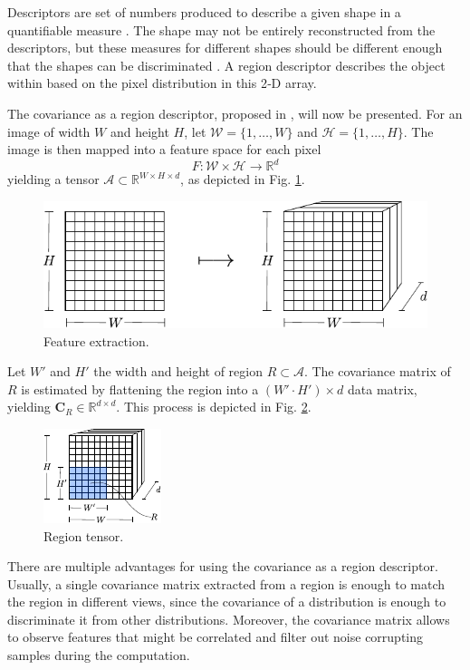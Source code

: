 \documentclass[11pt]{article}
\theoremstyle{definition}
\theoremstyle{remark}
\theoremstyle{remark}
\theoremstyle{remark}
\newcommand{\R}{{\mathbb{R}}}
\begin{document}
Descriptors are set of numbers produced to describe a given shape in a
quantifiable measure \parencite{tyagi2018content}. The shape may not be entirely
reconstructed from the descriptors, but these measures for different shapes
should be different enough that the shapes can be discriminated
\parencite{cui2013fusing}. A region descriptor describes the object within based
on the pixel distribution in this 2‐D array.

The covariance as a region descriptor, proposed in \parencite{tuzel2006}, will
now be presented. For an image of width $W$ and height $H$, let
$\mathcal{W}=\{1,\ldots,W\}$ and $\mathcal{H}=\{1,\ldots,H\}$. The image is then
mapped into a feature space for each pixel
%
\[
  F:\mathcal{W}\times\mathcal{H}\rightarrow\mathbb{R}^{d}
\]
%
yielding a tensor $\mathcal{A} \subset \R^{W \times H \times d}$, as depicted in
Fig. \ref{fig:feat_ext}.
%
\begin{figure}[H]
  \centering \includegraphics[width =
  0.6\linewidth]{figs/feature_extraction.pdf}
  \caption{Feature extraction.}
  \label{fig:feat_ext}
\end{figure}
%
Let $W'$ and $H'$ the width and height of region $R\subset\mathcal{A}$. The
covariance matrix of $R$ is estimated by flattening the region into a
$(W'\cdot H')\times d$ data matrix, yielding $\mathbf{C}_R \in \R^{d \times d}$.
This process is depicted in Fig. \ref{fig:region}.
%
\begin{figure}[H]
  \centering \includegraphics[width = 0.3\linewidth]{figs/region1.pdf}
  \caption{Region tensor.}
  \label{fig:region}
\end{figure}
%
There are multiple advantages for using the covariance as a region descriptor.
Usually, a single covariance matrix extracted from a region is enough to match
the region in different views, since the covariance of a distribution is enough
to discriminate it from other distributions. Moreover, the covariance matrix
allows to observe features that might be correlated and filter out noise
corrupting samples during the computation.
\end{document}
